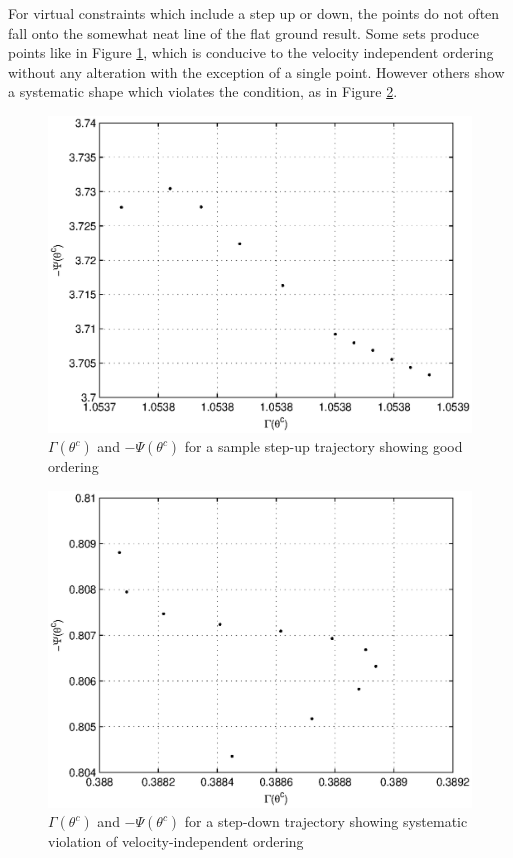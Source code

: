 For virtual constraints which include a step up or down, the points do not often fall onto the somewhat neat line of the flat ground result. Some sets produce points like in Figure \ref{fig:GPSU}, which is conducive to the velocity independent ordering without any alteration with the exception of a single point. However others show a systematic shape which violates the condition, as in Figure \ref{fig:GPSD}.

\begin{figure}
\centering
\includegraphics[width=0.8\linewidth]{7Results/GPSU}
\caption{$\Gamma(\theta^c)$ and $-\Psi(\theta^c)$ for a sample step-up trajectory showing good ordering}
\label{fig:GPSU}
\end{figure}

\begin{figure}
\centering
\includegraphics[width=0.8\linewidth]{7Results/GPSD}
\caption[$\Gamma(\theta^c)$ and $-\Psi(\theta^c)$ for a step-down trajectory]{$\Gamma(\theta^c)$ and $-\Psi(\theta^c)$ for a step-down trajectory showing systematic violation of velocity-independent ordering}
\label{fig:GPSD}
\end{figure}

